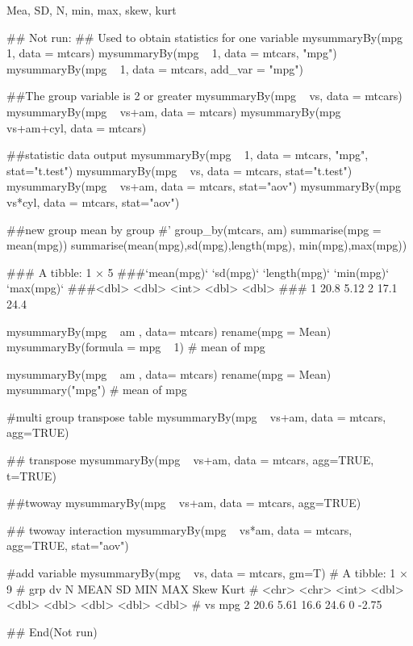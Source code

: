 \documentclass[a4paper]{book}
\begin{document}
%
\begin{Value}
Mea, SD, N, min, max, skew, kurt
\end{Value}
%
\begin{Examples}
\begin{ExampleCode}
## Not run: 
## Used to obtain statistics for one variable
mysummaryBy(mpg ~ 1, data = mtcars)
mysummaryBy(mpg ~ 1, data = mtcars, "mpg")
mysummaryBy(mpg ~ 1, data = mtcars, add_var = "mpg")

##The group variable is 2 or greater
mysummaryBy(mpg ~ vs, data = mtcars)
mysummaryBy(mpg ~ vs+am, data = mtcars)
mysummaryBy(mpg ~ vs+am+cyl, data = mtcars)

##statistic data output
mysummaryBy(mpg ~ 1, data = mtcars, "mpg", stat="t.test")
mysummaryBy(mpg ~ vs, data = mtcars, stat="t.test")
mysummaryBy(mpg ~ vs+am, data = mtcars, stat="aov")
mysummaryBy(mpg ~ vs*cyl, data = mtcars, stat="aov")

##new group mean by group
#' group_by(mtcars, am) %
 summarise(mpg = mean(mpg)) %
  summarise(mean(mpg),sd(mpg),length(mpg), min(mpg),max(mpg))

### A tibble: 1 × 5
###`mean(mpg)` `sd(mpg)` `length(mpg)` `min(mpg)` `max(mpg)`
###<dbl>     <dbl>         <int>      <dbl>      <dbl>
###  1        20.8      5.12             2       17.1       24.4

mysummaryBy(mpg ~ am , data= mtcars) %
    rename(mpg = Mean) %
      mysummaryBy(formula = mpg ~ 1)  # mean of mpg

mysummaryBy(mpg ~ am , data= mtcars) %
    rename(mpg = Mean) %
      mysummary("mpg")  # mean of mpg

#multi group transpose table
mysummaryBy(mpg ~ vs+am, data = mtcars, agg=TRUE)

## transpose
mysummaryBy(mpg ~ vs+am, data = mtcars, agg=TRUE, t=TRUE)

##twoway
mysummaryBy(mpg ~ vs+am, data = mtcars, agg=TRUE)


## twoway interaction
mysummaryBy(mpg ~ vs*am, data = mtcars, agg=TRUE, stat="aov")

#add variable
mysummaryBy(mpg ~ vs, data = mtcars, gm=T)
# A tibble: 1 × 9
# grp   dv        N  MEAN    SD   MIN   MAX  Skew  Kurt
# <chr> <chr> <int> <dbl> <dbl> <dbl> <dbl> <dbl> <dbl>
#  vs    mpg       2  20.6  5.61  16.6  24.6     0 -2.75


## End(Not run)



\end{ExampleCode}
\end{Examples}
\end{document}
